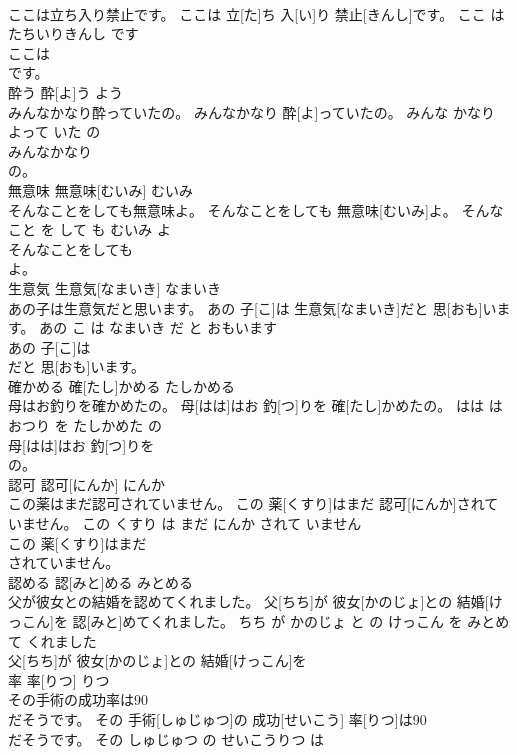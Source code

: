 \documentclass[8pt]{extreport}
\begin{document}
\begin{CJK}{UTF8}{min}
\\	ここは立ち入り禁止です。	ここは 立[た]ち 入[い]り 禁止[きんし]です。	ここ は たちいりきんし です	
\\	ここは
\\	です。			
\\	酔う	酔[よ]う	よう	
\\	みんなかなり酔っていたの。	みんなかなり 酔[よ]っていたの。	みんな かなり よって いた の	
\\	みんなかなり
\\	の。			
\\	無意味	無意味[むいみ]	むいみ	
\\	そんなことをしても無意味よ。	そんなことをしても 無意味[むいみ]よ。	そんな こと を して も むいみ よ	
\\	そんなことをしても
\\	よ。			
\\	生意気	生意気[なまいき]	なまいき	
\\	あの子は生意気だと思います。	あの 子[こ]は 生意気[なまいき]だと 思[おも]います。	あの こ は なまいき だ と おもいます	
\\	あの 子[こ]は
\\	だと 思[おも]います。			
\\	確かめる	確[たし]かめる	たしかめる	
\\	母はお釣りを確かめたの。	母[はは]はお 釣[つ]りを 確[たし]かめたの。	はは は おつり を たしかめた の	
\\	母[はは]はお 釣[つ]りを
\\	の。			
\\	認可	認可[にんか]	にんか	
\\	この薬はまだ認可されていません。	この 薬[くすり]はまだ 認可[にんか]されていません。	この くすり は まだ にんか されて いません	
\\	この 薬[くすり]はまだ
\\	されていません。			
\\	認める	認[みと]める	みとめる	
\\	父が彼女との結婚を認めてくれました。	父[ちち]が 彼女[かのじょ]との 結婚[けっこん]を 認[みと]めてくれました。	ちち が かのじょ と の けっこん を みとめて くれました	
\\	父[ちち]が 彼女[かのじょ]との 結婚[けっこん]を
\\	率	率[りつ]	りつ	
\\	その手術の成功率は90
\\	だそうです。	その 手術[しゅじゅつ]の 成功[せいこう] 率[りつ]は90
\\	だそうです。	その しゅじゅつ の せいこうりつ は 

\end{CJK}
\end{document}
